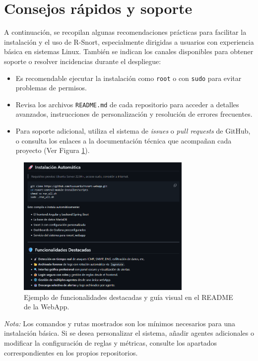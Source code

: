 \documentclass[11pt,a4paper,twoside]{report}
\begin{document}
\section{Consejos rápidos y soporte}

A continuación, se recopilan algunas recomendaciones prácticas para facilitar la instalación y el uso de R-Snort, especialmente dirigidas a usuarios con experiencia básica en sistemas Linux. También se indican los canales disponibles para obtener soporte o resolver incidencias durante el despliegue:

\begin{itemize}
	\item Es recomendable ejecutar la instalación como \texttt{root} o con \texttt{sudo} para evitar problemas de permisos.
	
	\item Revisa los archivos \texttt{README.md} de cada repositorio para acceder a detalles avanzados, instrucciones de personalización y resolución de errores frecuentes.
	
	\item Para soporte adicional, utiliza el sistema de \emph{issues} o \emph{pull requests} de GitHub, o consulta los enlaces a la documentación técnica que acompañan cada proyecto (Ver Figura \ref{fig:docu-tres}).
\end{itemize}

\begin{figure}[H]
	\centering
	\includegraphics[width=0.75\textwidth]{apendix_web/3.png}
	\caption{Ejemplo de funcionalidades destacadas y guía visual en el README de la WebApp.}
	\label{fig:docu-tres}
\end{figure}

\noindent
\textit{Nota:} Los comandos y rutas mostrados son los mínimos necesarios para una instalación básica. Si se desea personalizar el sistema, añadir agentes adicionales o modificar la configuración de reglas y métricas, consulte los apartados correspondientes en los propios repositorios.
\end{document}
